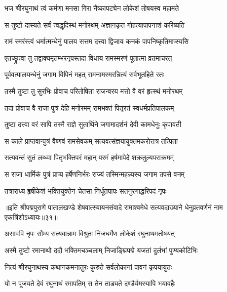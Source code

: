 \twolineshloka
{भज श्रीरघुनाथं त्वं कर्मणा मनसा गिरा}
{नैष्कापट्येन लोकेशं तोषयस्व महामते}%

\twolineshloka
{स तुष्टो दास्यते सर्वं त्वद्धृदिस्थं मनोरथम्}
{अज्ञानकृत गोहत्यापापनाशं करिष्यति}%

\twolineshloka
{रामं स्मरंस्त्वं धर्मात्मन्धेनुं पालय सत्तम}
{दत्त्वा द्विजाय कनकं पापनिष्कृतिमाप्स्यसि}%


\twolineshloka
{एतच्छ्रुत्वा तु तद्वाक्यमृतम्भरनृपस्तदा}
{विधाय रामस्मरणं पूतात्मा व्रतमाचरत्}%

\twolineshloka
{पूर्ववत्पालयन्धेनुं जगाम विपिनं महत्}
{रामनामस्मरन्नित्यं सर्वभूतहिते रतः}%

\twolineshloka
{तस्मै तुष्टा तु सुरभिः प्रोवाच परितोषिता}
{राजन्वरय मत्तो वै वरं हृत्स्थं मनोरथम्}%

\twolineshloka
{तदा प्रोवाच वै राजा पुत्रं देहि मनोरमम्}
{रामभक्तं पितृरतं स्वधर्मप्रतिपालकम्}%

\twolineshloka
{तुष्टा दत्त्वा वरं सापि तस्मै राज्ञे सुतार्थिने}
{जगामादर्शनं देवी कामधेनुः कृपावती}%

\twolineshloka
{स काले प्राप्तवान्पुत्रं वैष्णवं रामसेवकम्}
{सत्यवत्संज्ञयायुक्तमकरोत्तत्र तत्पिता}%

\twolineshloka
{सत्यवन्तं सुतं लब्ध्वा पितृभक्तिपरं महान्}
{परमं हर्षमापेदे शक्रतुल्यपराक्रमम्}%

\twolineshloka
{स राजा धार्मिकं पुत्रं प्राप्य हर्षेणनिर्भरः}
{राज्यं तस्मिन्महन्न्यस्य जगाम तपसे वनम्}%

\twolineshloka
{तत्राराध्य हृषीकेशं भक्तियुक्तेन चेतसा}
{निर्धूतपापः सतनुरगाद्धरिपदं नृपः}%

॥इति श्रीपद्मपुराणे पातालखण्डे शेषवात्स्यायनसंवादे रामाश्वमेधे सत्यवदाख्याने धेनुव्रतवर्णनं नाम एकत्रिंशोऽध्यायः॥३१॥



\twolineshloka
{असावपि नृपः सौम्य सत्यवान्नाम विश्रुतः}
{निजधर्मेण लोकेशं रघुनाथमतोषयत्}%

\twolineshloka
{अस्मै तुष्टो रमानाथो ददौ भक्तिमचञ्चलाम्}
{निजाङ्घ्रिपद्मे यजतां दुर्लभां पुण्यकोटिभिः}%

\twolineshloka
{नित्यं श्रीरघुनाथस्य कथानकमनातुरः}
{कुरुते सर्वलोकानां पावनं कृपयायुतः}%

\twolineshloka
{यो न पूजयते देवं रघुनाथं रमापतिम्}
{स तेन ताड्यते दण्डैर्यमस्यापि भयावहैः}%

